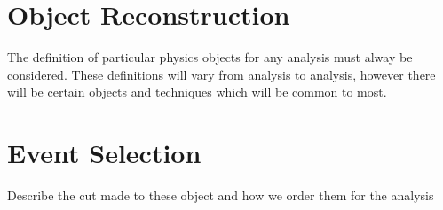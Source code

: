 \section{Object Reconstruction}
The definition of particular physics objects for any analysis must alway be considered. These definitions will vary from analysis to analysis, however there will be certain objects and techniques which will be common to most. 

\section{Event Selection}
Describe the cut made to these object and how we order them for the analysis

